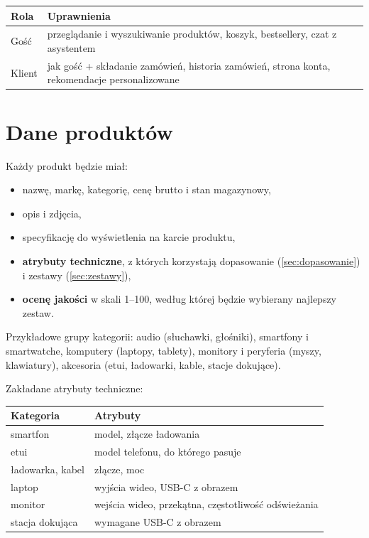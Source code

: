 \documentclass[11pt,a4paper]{article}
\begin{document}
{\small
\begin{tabularx}{\textwidth}{P{2.8cm}L}
\toprule
\textbf{Rola} & \textbf{Uprawnienia} \\
\midrule
Gość & przeglądanie i wyszukiwanie produktów, koszyk, bestsellery, czat z asystentem \\
Klient & jak gość + składanie zamówień, historia zamówień, strona konta, rekomendacje personalizowane \\
\bottomrule
\end{tabularx}\par\medskip
}

\section{Dane produktów}

Każdy produkt będzie miał:
\begin{itemize}
  \item nazwę, markę, kategorię, cenę brutto i stan magazynowy,
  \item opis i zdjęcia,
  \item specyfikację do wyświetlenia na karcie produktu,
  \item \textbf{atrybuty techniczne}, z których korzystają dopasowanie (\ref{sec:dopasowanie}) i zestawy
        (\ref{sec:zestawy}),
  \item \textbf{ocenę jakości} w skali 1--100, według której będzie wybierany najlepszy zestaw.
\end{itemize}

Przykładowe grupy kategorii: audio (słuchawki, głośniki), smartfony i smartwatche, komputery (laptopy,
tablety), monitory i peryferia (myszy, klawiatury), akcesoria (etui, ładowarki, kable, stacje dokujące).

\filbreak
Zakładane atrybuty techniczne:

{\small
\begin{tabularx}{\textwidth}{P{3.6cm}L}
\toprule
\textbf{Kategoria} & \textbf{Atrybuty} \\
\midrule
smartfon & model, złącze ładowania \\
etui & model telefonu, do którego pasuje \\
ładowarka, kabel & złącze, moc \\
laptop & wyjścia wideo, USB-C z obrazem \\
monitor & wejścia wideo, przekątna, częstotliwość odświeżania \\
stacja dokująca & wymagane USB-C z obrazem \\
\bottomrule
\end{tabularx}\par\medskip
}
\end{document}
